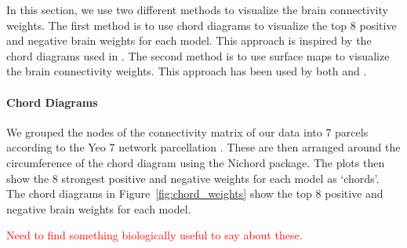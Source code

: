 In this section, we use two different methods to visualize the brain connectivity weights.
The first method is to use chord diagrams to visualize the top 8 positive and negative brain \gls{weights} for each model.
This approach is inspired by the chord diagrams used in \cite{smith2015positive}.
The second method is to use surface maps to visualize the brain connectivity weights.
This approach has been used by both \cite{ferreira2022hierarchical} and \cite{smith2015positive}.

\paragraph{Chord Diagrams}
We grouped the nodes of the connectivity matrix of our data into 7 parcels according to the Yeo 7 network parcellation \cite{yeo2011organization}.
These are then arranged around the circumference of the chord diagram using the Nichord package\citep{bogdan2023connsearch}.
The plots then show the 8 strongest positive and negative \gls{weights} for each model as `chords'.
The chord diagrams in Figure~\ref{fig:chord_weights} show the top 8 positive and negative brain \gls{weights} for each model.

\textcolor{red}{Need to find something biologically useful to say about these.}

